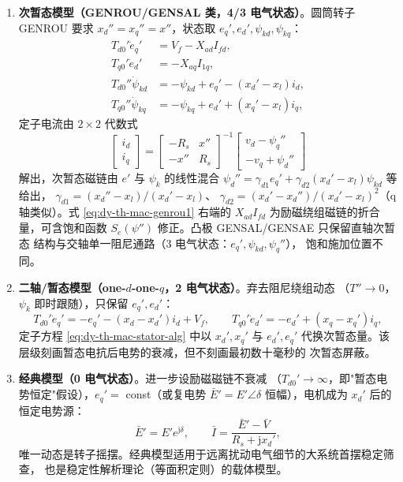 \begin{enumerate}
  \item \textbf{次暂态模型（GENROU/GENSAL 类，4/3 电气状态）}。圆筒转子 GENROU
        要求 $x_d''=x_q''=x''$，状态取 $e_q',e_d',\psi_{kd},\psi_{kq}$：
        \begin{align}
        T_{d0}'\dot e_q'&=V_f-X_{ad}I_{fd},\label{eq:dy-th-mac-genrou1}\\
        T_{q0}'\dot e_d'&=-X_{aq}I_{1q},\\
        T_{d0}''\dot\psi_{kd}&=-\psi_{kd}+e_q'-(x_d'-x_l)i_d,\\
        T_{q0}''\dot\psi_{kq}&=-\psi_{kq}+e_d'+(x_q'-x_l)i_q,\label{eq:dy-th-mac-genrou4}
        \end{align}
        定子电流由 $2\times2$ 代数式
        \begin{equation}
        \begin{bmatrix}i_d\\i_q\end{bmatrix}
        =\begin{bmatrix}-R_s&x''\\-x''&R_s\end{bmatrix}^{-1}
        \begin{bmatrix}v_d-\psi_q''\\-v_q+\psi_d''\end{bmatrix}
        \label{eq:dy-th-mac-genrou-stator}
        \end{equation}
        解出，次暂态磁链由 $e'$ 与 $\psi_k$ 的线性混合
        $\psi_d''=\gamma_{d1}e_q'+\gamma_{d2}(x_d'-x_l)\psi_{kd}$ 等给出，
        $\gamma_{d1}=(x_d''-x_l)/(x_d'-x_l)$、
        $\gamma_{d2}=(x_d'-x_d'')/(x_d'-x_l)^2$（q 轴类似）。式
        \eqref{eq:dy-th-mac-genrou1} 右端的 $X_{ad}I_{fd}$ 为励磁绕组磁链的折合
        量，可含饱和函数 $S_e(\psi'')$ 修正。凸极 GENSAL/GENSAE 只保留直轴次暂态
        结构与交轴单一阻尼通路（3 电气状态：$e_q',\psi_{kd},\psi_q''$），
        饱和施加位置不同。
  \item \textbf{二轴/暂态模型（one-$d$-one-$q$，2 电气状态）}。弃去阻尼绕组动态
        （$T''\to0$，$\psi_k$ 即时跟随），只保留 $e_q',e_d'$：
        \begin{equation}
        T_{d0}'\dot e_q'=-e_q'-(x_d-x_d')i_d+V_f,\qquad
        T_{q0}'\dot e_d'=-e_d'+(x_q-x_q')i_q,
        \label{eq:dy-th-mac-oneq}
        \end{equation}
        定子方程 \eqref{eq:dy-th-mac-stator-alg} 中以 $x_d',x_q'$ 与 $e_d',e_q'$
        代换次暂态量。该层级刻画暂态电抗后电势的衰减，但不刻画最初数十毫秒的
        次暂态屏蔽。
  \item \textbf{经典模型（0 电气状态）}。进一步设励磁磁链不衰减
        （$T_{d0}'\to\infty$，即"暂态电势恒定"假设），$e_q'=$ const（或复电势
        $\bar E'=E'\angle\delta$ 恒幅），电机成为 $x_d'$ 后的恒定电势源：
        \begin{equation}
        \bar E'=E'e^{\mathrm j\delta},\qquad
        \bar I=\frac{\bar E'-\bar V}{R_s+\mathrm jx_d'},
        \label{eq:dy-th-mac-classical}
        \end{equation}
        唯一动态是转子摇摆。经典模型适用于远离扰动电气细节的大系统首摆稳定筛查，
        也是稳定性解析理论（等面积定则）的载体模型。
\end{enumerate}

